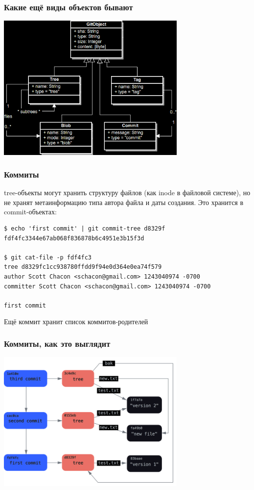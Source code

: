 \documentclass{../cscslides}
\begin{document}
    \begin{frame}
        \frametitle{Какие ещё виды объектов бывают}
        \begin{center}
            \includegraphics[width=0.7\textwidth]{gitDataStructureBlack.png}
        \end{center}
    \end{frame}

    \begin{frame}[fragile]
        \frametitle{Коммиты}
        tree-объекты могут хранить структуру файлов (как inode в файловой системе), но не хранят метаинформацию типа автора файла и даты создания. Это хранится в commit-объектах:
        \begin{verbatim}
$ echo 'first commit' | git commit-tree d8329f
fdf4fc3344e67ab068f836878b6c4951e3b15f3d

$ git cat-file -p fdf4fc3
tree d8329fc1cc938780ffdd9f94e0d364e0ea74f579
author Scott Chacon <schacon@gmail.com> 1243040974 -0700
committer Scott Chacon <schacon@gmail.com> 1243040974 -0700

first commit
        \end{verbatim}
        Ещё коммит хранит список коммитов-родителей
    \end{frame}

    \begin{frame}
        \frametitle{Коммиты, как это выглядит}
        \begin{center}
            \includegraphics[width=0.7\textwidth]{gitCommitObjectsBlack.png}
        \end{center}
    \end{frame}
\end{document}

